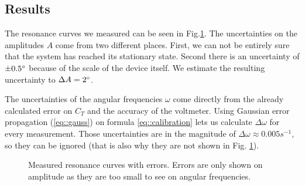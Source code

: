 \subsection{Results}
The resonance curves we measured can be seen in Fig.\ref{fig::resonance}.
The uncertainties on the amplitudes $A$ come from two different places.
First, we can not be entirely sure that the system has reached its stationary state.
Second there is an uncertainty of $\pm 0.5 \degree$ because of the scale of the device itself.
We estimate the resulting uncertainty to $\Delta A = 2 \degree$.

The uncertainties of the angular frequencies $\omega$ come directly from the already calculated error on $C_T$ and the accuracy of the voltmeter.
Using Gaussian error propagation (\ref{eq::gauss}) on formula \ref{eq::calibration} lets us calculate $\Delta \omega$ for every measurement. 
Those uncertainties are in the magnitude of $\Delta \omega \approx 0.005 s^{-1}$, so they can be ignored (that is also why they are not shown in Fig. \ref{fig::resonance}).

\begin{figure} [ht]
	\centering
	
	\caption{Measured resonance curves with errors. Errors are only shown on amplitude as they are too small to see on angular frequencies.}
	\label{fig::resonance}
\end{figure}
